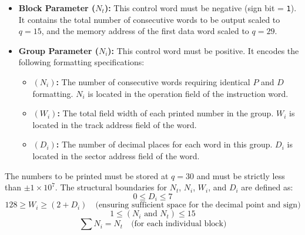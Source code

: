 \begin{itemize}
    \item \textbf{Block Parameter ($N_t$):} This control word must be negative (sign bit = \texttt{1}). It contains the total number of consecutive words to be output scaled to $q=15$, and the memory address of the first data word scaled to $q=29$.
    \item \textbf{Group Parameter ($N_i$):} This control word must be positive. It encodes the following formatting specifications:
    \begin{itemize}
        \item \textbf{$(N_i)$:} The number of consecutive words requiring identical $P$ and $D$ formatting. $N_i$ is located in the operation field of the instruction word.
        \item \textbf{$(W_i)$:} The total field width of each printed number in the group. $W_i$ is located in the track address field of the word.
        \item \textbf{$(D_i)$:} The number of decimal places for each word in this group. $D_i$ is located in the sector address field of the word.
    \end{itemize}
\end{itemize}

The numbers to be printed must be stored at $q=30$ and must be strictly less than $\pm 1 \times 10^7$. The structural boundaries for $N_t$, $N_i$, $W_i$, and $D_i$ are defined as:
\[
0 \le D_i \le 7
\]
\[
128 \ge W_i \ge (2 + D_i) \quad \text{(ensuring sufficient space for the decimal point and sign)}
\]
\[
1 \le (N_i \text{ and } N_t) \le 15
\]
\[
\sum N_i = N_t \quad \text{(for each individual block)}
\]
